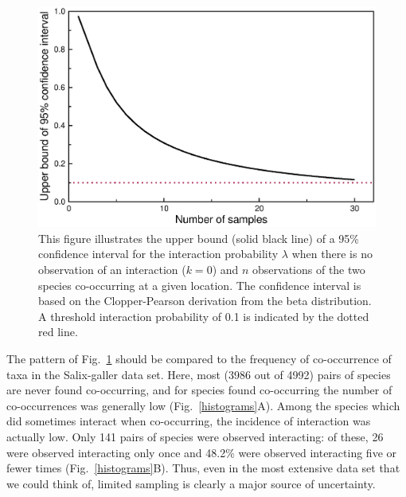 \documentclass[12pt]{article}
\begin{document}
  \begin{figure}
    \caption{This figure illustrates the upper bound (solid black line) of a 95\% confidence interval for the interaction probability $\lambda$ when there is no observation of an interaction ($k = 0$) and $n$ observations of the two species co-occurring at a given location. The confidence interval is based on the Clopper-Pearson derivation from the beta distribution. A threshold interaction probability of 0.1 is indicated by the dotted red line.}
    \label{upper_limits}
    \includegraphics*[width=.8\textwidth]{figures/upper_limit_DG.eps}
  \end{figure}


  The pattern of Fig.~\ref{upper_limits} should be compared to the frequency of co-occurrence of taxa in the Salix-galler data set. Here, most (3986 out of 4992) pairs of species are never found co-occurring, and for species found co-occurring the number of co-occurrences was generally low (Fig.~\ref{histograms}A). Among the species which did sometimes interact when co-occurring, the incidence of interaction was actually low. Only 141 pairs of species were observed interacting: of these, 26 were observed interacting only once and 48.2\% were observed interacting five or fewer times (Fig.~\ref{histograms}B). Thus, even in the most extensive data set that we could think of, limited sampling is clearly a major source of uncertainty.
\end{document}
